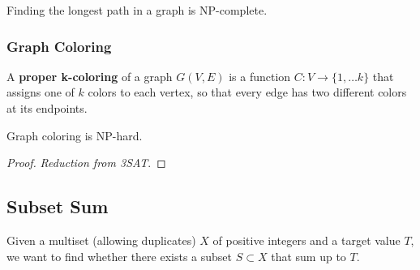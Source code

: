     \begin{theorem}
      \label{thm:longest-path}
      Finding the longest path in a graph is NP-complete. 
    \end{theorem}

  \subsubsection{Graph Coloring} 

    \begin{definition}
      \label{def:proper-k-coloring}
      A \textbf{proper k-coloring} of a graph $G(V, E)$ is a function $C: V \rightarrow \{1, \ldots k\}$ that assigns one of $k$ colors to each vertex, so that every edge has two different colors at its endpoints. 
    \end{definition}

    \begin{theorem}
      \label{thm:graph-coloring-is-np-hard}
      Graph coloring is NP-hard. 
    \end{theorem}
    \begin{proof}
      \textit{Reduction from 3SAT}. 
    \end{proof}

\subsection{Subset Sum}

  \begin{definition}
    \label{def:subset-sum}
    Given a multiset (allowing duplicates) $X$ of positive integers and a target value $T$, we want to find whether there exists a subset $S \subset X$ that sum up to $T$. 
  \end{definition}


